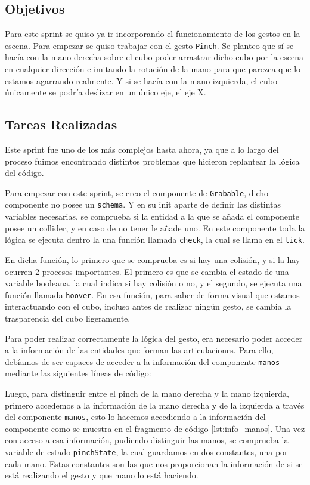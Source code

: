 \documentclass[a4paper, 12pt]{book}
\begin{document}
\subsection{Objetivos}
\label{subsec:objetivo-principal5}
Para este sprint se quiso ya ir incorporando el funcionamiento de los gestos en la escena. Para empezar se quiso trabajar con el gesto \texttt{Pinch}. Se planteo que sí se hacía con la mano derecha sobre el cubo poder 
arrastrar dicho cubo por la escena en cualquier dirección e imitando la rotación de la mano para que parezca que lo estamos agarrando realmente. Y si se hacía con la mano izquierda, el cubo únicamente se podría deslizar en un único eje, el eje X.

\subsection{Tareas Realizadas}
\label{subsec:implementacion5}
Este sprint fue uno de los más complejos hasta ahora, ya que a lo largo del proceso fuimos encontrando distintos problemas que hicieron replantear la lógica del código. 

Para empezar con este sprint, se creo el componente de \texttt{Grabable}, dicho componente no posee un \texttt{schema}. Y en su init aparte de definir las distintas variables necesarias, se comprueba si la entidad a la que se añada el componente posee un collider, y en caso de no tener le añade uno.
En este componente toda la lógica se ejecuta dentro la una función llamada \texttt{check}, la cual se llama en el \texttt{tick}. 

En dicha función, lo primero que se comprueba es si hay una colisión, y si la hay ocurren 2 procesos importantes. El primero es que se cambia el estado de una variable booleana, la cual indica si hay colisión o no, y el segundo, se ejecuta una función llamada \texttt{hoover}. En esa función, para saber de forma visual que estamos interactuando con el cubo, incluso antes de realizar ningún gesto, se cambia la trasparencia del cubo ligeramente.

Para poder realizar correctamente la lógica del gesto, era necesario poder acceder a la información de las entidades que forman las articulaciones. Para ello, debíamos de ser capaces de acceder a la información del componente \texttt{manos} mediante las siguientes líneas de código:

Luego, para distinguir entre el pinch de la mano derecha y la mano izquierda, primero accedemos a la información de la mano derecha y de la izquierda a través del componente \texttt{manos}, esto lo hacemos accediendo a la información del componente como se muestra en el fragmento de código \ref{lst:info_manos}. Una vez con acceso a esa información, pudiendo distinguir las manos, se comprueba la variable de estado \texttt{pinchState}, la cual guardamos en dos constantes, una por cada mano. Estas constantes son las que nos proporcionan la información de si se está realizando el gesto y que mano lo está haciendo.
\end{document}
